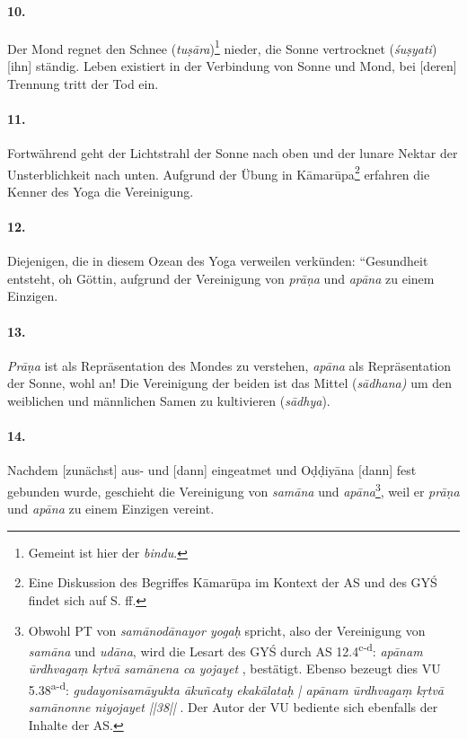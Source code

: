 \documentclass[a4paper,12pt]{article}
\begin{document}
\paragraph{10.} Der Mond regnet den Schnee (\textit{tuṣāra})\footnote{Gemeint ist hier der \textit{bindu}.} nieder, die Sonne vertrocknet (\textit{śuṣyati}) [ihn] ständig. Leben existiert in der Verbindung von Sonne und Mond, bei [deren] Trennung tritt der Tod ein. 

\paragraph{11.} Fortwährend geht der Lichtstrahl der Sonne nach oben und der lunare Nektar der Unsterblichkeit nach unten. Aufgrund der Übung in Kāmarūpa\footnote{Eine Diskussion des Begriffes Kāmarūpa im Kontext der AS und des GYŚ findet sich auf S.\pageref{kamarupa} ff.} erfahren die Kenner des Yoga die Vereinigung. 

\paragraph{12.} Diejenigen, die in diesem Ozean des Yoga verweilen verkünden: ``Gesundheit entsteht, oh Göttin, aufgrund der Vereinigung von \textit{prāṇa} und \textit{apāna} zu einem Einzigen.

\paragraph{13.} \textit{Prāṇa} ist als Repräsentation des Mondes zu verstehen, \textit{apāna} als Repräsentation der Sonne, wohl an! Die Vereinigung der beiden ist das Mittel (\textit{sādhana)} um den weiblichen und männlichen Samen zu kultivieren (\textit{sādhya}). 

\paragraph{14.} Nachdem [zunächst] aus- und [dann] eingeatmet und Oḍḍiyāna [dann] fest gebunden wurde, geschieht die Vereinigung von \textit{samāna} und \textit{apāna}\footnote{Obwohl PT von \textit{samānodānayor yogaḥ} spricht, also der Vereinigung von \textit{samāna} und \textit{udāna}, wird die Lesart des GYŚ durch AS 12.4\textsuperscript{c-d}: \textit{apānam ūrdhvagaṃ kṛtvā samānena ca yojayet} \parencite[17]{asiddhi}, bestätigt. Ebenso bezeugt dies VU 5.38\textsuperscript{a-d}: \textit{gudayonisamāyukta ākuñcaty ekakālataḥ | apānam ūrdhvagaṃ kṛtvā samānonne niyojayet ||38||} \parencite[17]{varahaupanishad}. Der Autor der VU bediente sich ebenfalls der Inhalte der AS.}, weil er \textit{prāṇa} und \textit{apāna} zu einem Einzigen vereint. 
\end{document}
